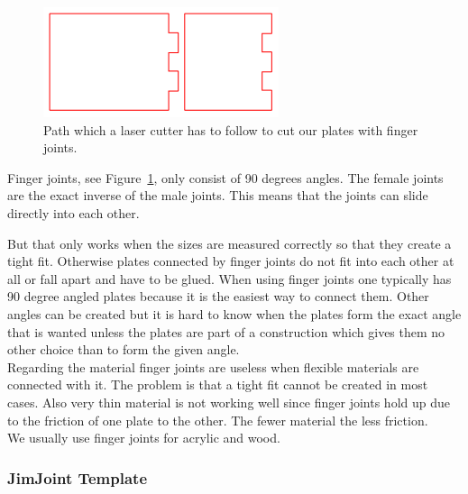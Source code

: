 \documentclass[../ClassicThesis.tex]{subfiles}
\begin{document}
\begin{figure}[!ht]
\centering
\includegraphics[width=.5\columnwidth]{Images/fingerjoints.png}
\caption{Path which a laser cutter has to follow to cut our plates with finger joints.}
\label{fig:fingerjoints}
\end{figure}


Finger joints, see Figure~\ref{fig:fingerjoints}, only consist of 90 degrees angles. The female joints are the exact inverse of the male joints. This means that the joints can slide directly into each other. 

But that only works when the sizes are measured correctly so that they create a tight fit. Otherwise plates connected by finger joints do not fit into each other at all or fall apart and have to be glued. 
When using finger joints one typically has 90 degree angled plates because it is the easiest way to connect them. Other angles can be created but it is hard to know when the plates form the exact angle that is wanted unless the plates are part of a construction which gives them no other choice than to form the given angle.\\
Regarding the material finger joints are useless when flexible materials are connected with it. The problem is that a tight fit cannot be created in most cases. Also very thin material is not working well since finger joints hold up due to the friction of one plate to the other. The fewer material the less friction.\\
We usually use finger joints for acrylic and wood.


\subsubsection{JimJoint Template}
\end{document}
